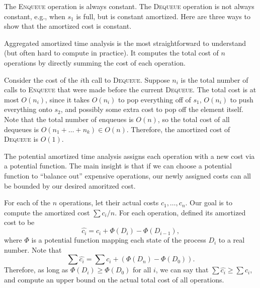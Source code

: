 The \textsc{Enqueue} operation is always constant. The \textsc{Dequeue} operation is not always constant, e.g., when $s_1$ is full, but is constant amortized. Here are three ways to show that the amortized cost is constant. 

\begin{definition}

\ac{Aggregated} amortized time analysis is the most straightforward to understand (but often hard to compute in practice). It computes the total cost of $n$ operations by directly summing the cost of each operation.
\end{definition}

Consider the cost of the $i$th call to \textsc{Dequeue}. Suppose $n_i$ is the total number of calls to \textsc{Enqueue} that were made before the current \textsc{Dequeue}. The total cost is at most $O(n_i)$, since it takes $O(n_i)$ to pop everything off of $s_1$, $O(n_i)$ to push everything onto $s_2$, and possibly some extra cost to pop off the element itself. Note that the total number of enqueues is $O(n)$, so the total cost of all dequeues is $O(n_1+\hdots +n_k) \in O(n)$. Therefore, the amortized cost of \textsc{Dequeue} is $O(1)$. 



\begin{definition}

The \ac{potential} amortized time analysis assigns each operation with a new cost via a potential function. The main insight is that if we can choose a potential function to ``balance out'' expensive operations, our newly assigned costs can all be bounded by our desired amoritzed cost.  
\end{definition}

For each of the $n$ operations, let their actual costs $c_1, \hdots, c_n$. Our goal is to compute the amortized cost $\sum c_i / n$. For each operation, defined its amortized cost to be
\[\hat{c_i} = c_i + \Phi(D_i) - \Phi(D_{i-1}),\]
where $\Phi$ is a potential function mapping each state of the process $D_i$ to a real number. Note that 
\[\sum \hat{c_i} = \sum c_i + (\Phi(D_n) - \Phi(D_0)).\]
Therefore, as long as $\Phi(D_i)\geq \Phi(D_0)$ for all $i$, we can say that $\sum \hat{c_i}\geq \sum c_i$, and compute an upper bound on the actual total cost of all operations.

